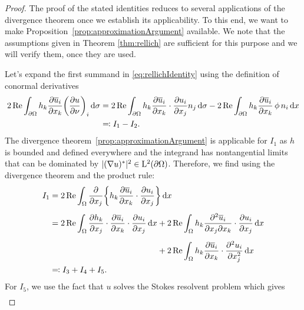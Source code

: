 \begin{proof}
  The proof of the stated identities reduces to several applications of the divergence theorem once we establish its applicability.
  To this end, we want to make Proposition~\ref{prop:approximationArgument} available. We note that the assumptions given in Theorem \ref{thm:rellich} are sufficient for this purpose and we will verify them, once they are used.

  Let's expand the first summand in \eqref{eq:rellichIdentity} using the definition of conormal derivatives
  \begin{align*}
    2\operatorname{Re} \int_{\partial\Omega} h_k \frac{\partial \overline u_i}{\partial x_k} \bigg( \frac{\partial u}{\partial \nu} \bigg)_i \, {\operatorname{d}\!{\sigma}}
    &= 2 \operatorname{Re} \int_{\partial\Omega} h_k \frac{\partial \overline u_i}{\partial x_k} \cdot \frac{\partial u_i}{\partial x_j}  n_j \, {\operatorname{d}\!{\sigma}}  - 2\operatorname{Re} \int_{\partial\Omega} h_k \frac{\partial \overline u_i}{\partial x_k} \, \phi\, n_i \, {\operatorname{d}\!{x}} \\
    &\eqqcolon I_1 - I_2.
  \end{align*}
  The divergence theorem~\ref{prop:approximationArgument} is applicable for $I_1$ as $h$ is bounded and defined everywhere and the integrand has nontangential limits that can be dominated by $|(\nabla u)^*|^2 \in \mathrm{L}^2(\partial\Omega)$.
  Therefore, we find using the divergence theorem and the product rule:
  \begin{align*}
    I_1
    &= 2\Ret \int_\Omega \frac{\partial}{\partial x_j} \bigg\{ h_k \frac{\partial \overline u_i}{\partial x_k} \cdot \frac{\partial u_i}{\partial x_j} \bigg\} \d x \\[0.5em]
    &= 2\Ret \int_\Omega \frac{\partial h_k}{\partial x_j} \cdot \frac{\partial \overline u_i}{\partial x_k} \cdot \frac{\partial u_i}{\partial x_j} \d x 
    + 2\Ret \int_{\Omega} h_k \frac{\partial^2 \overline u_i}{\partial x_j \partial x_k} \cdot \frac{\partial u_i}{\partial x_j} \d x  \\[0.5em]
    &\hphantom{= 2\Ret \int_\Omega \frac{\partial h_k}{\partial x_j} \cdot \frac{\partial \overline u_i}{\partial x_k} \cdot \frac{\partial u_i}{\partial x_j} \d x } \;
    + 2 \Ret \int_\Omega h_k \frac{\partial \overline u_i}{\partial x_k} \cdot \frac{\partial^2 u_i}{\partial x_j^2} \d x \\
    &\eqqcolon I_3 + I_4 + I_5.
  \end{align*}
  For $I_5$, we use the fact that $u$ solves the Stokes resolvent problem which gives
  \begin{align*}

\end{align*}
\end{proof}
